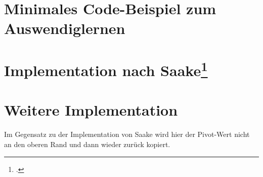 \documentclass{bschlangaul-theorie}
\begin{document}
\newpage

\section{Minimales Code-Beispiel zum Auswendiglernen}


\section{Implementation nach Saake\footcite[Seite 138 (PDF 156)]{saake}}


\newpage

\section{Weitere Implementation}


Im Gegensatz zu der Implementation von Saake wird hier der Pivot-Wert
nicht an den oberen Rand und dann wieder zurück kopiert.


\literatur
\end{document}
